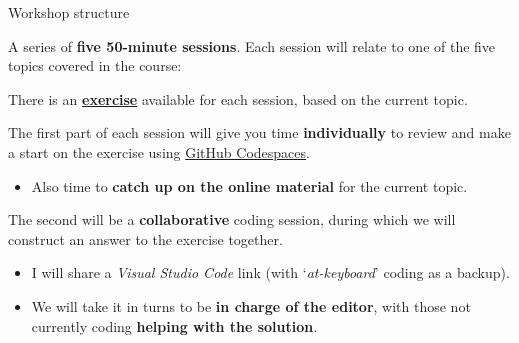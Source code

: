 \documentclass[10pt, dvipsnames, table, aspectratio=169]{beamer}
\begin{document}

\begin{frame}{Workshop structure}

A series of \textbf{five 50-minute sessions}.
Each session will relate to one of the five topics covered in the course:

\begin{centering}

\begin{table}[h!]

    \centering

    

\end{table}

\end{centering}

\framebreak

There is an \href{https://github.com/martinteaching/sustainability/blob/master/workshops/kcl/2025/workshop-exercises.md}{\textbf{exercise}} available for each session, based on the current topic.

The first part of each session will give you time \textbf{individually} to review and make a start on the exercise using \href{https://github.com/martinteaching/sustainability/tree/master/workshops/kcl/2025#github-codespaces-recommended}{GitHub Codespaces}.

\begin{itemize}

    \item Also time to \textbf{catch up on the online material} for the current topic.

\end{itemize}

The second will be a \textbf{collaborative} coding session, during which we will construct an answer to the exercise together.

\begin{itemize}

  \item I will share a \emph{Visual Studio Code} link (with `\textit{at-keyboard}' coding as a backup).

  \item We will take it in turns to be \textbf{in charge of the editor}, with those not currently coding \textbf{helping with the solution}.

\end{itemize}

\end{frame}
\end{document}
